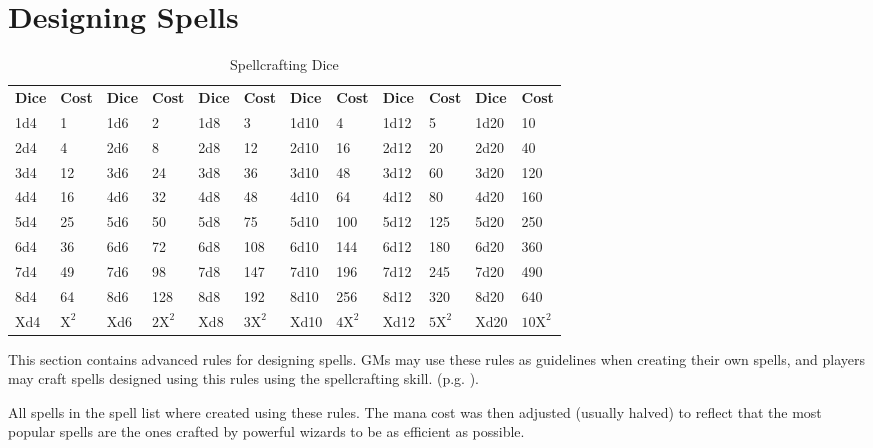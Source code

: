 \section{Designing Spells}

\begin{table*}[ht]
    \unclassedrowcolors
    \begin{tabularx}{\textwidth}{l X l X l X l X l X l X}
        \textbf{Dice} & \textbf{Cost} & \textbf{Dice} & \textbf{Cost} & \textbf{Dice} & \textbf{Cost} & \textbf{Dice} & \textbf{Cost} & \textbf{Dice} & \textbf{Cost} & \textbf{Dice} & \textbf{Cost} \\
        1d4 & 1   & 1d6 & 2    & 1d8 & 3    & 1d10 & 4    & 1d12 & 5    & 1d20 & 10    \\
        2d4 & 4   & 2d6 & 8    & 2d8 & 12   & 2d10 & 16   & 2d12 & 20   & 2d20 & 40    \\
        3d4 & 12  & 3d6 & 24   & 3d8 & 36   & 3d10 & 48   & 3d12 & 60   & 3d20 & 120   \\
        4d4 & 16  & 4d6 & 32   & 4d8 & 48   & 4d10 & 64   & 4d12 & 80   & 4d20 & 160   \\
        5d4 & 25  & 5d6 & 50   & 5d8 & 75   & 5d10 & 100  & 5d12 & 125  & 5d20 & 250   \\
        6d4 & 36  & 6d6 & 72   & 6d8 & 108  & 6d10 & 144  & 6d12 & 180  & 6d20 & 360   \\
        7d4 & 49  & 7d6 & 98   & 7d8 & 147  & 7d10 & 196  & 7d12 & 245  & 7d20 & 490   \\
        8d4 & 64  & 8d6 & 128  & 8d8 & 192  & 8d10 & 256  & 8d12 & 320  & 8d20 & 640   \\
        Xd4 & $\text{X}^\text{2}$ & Xd6 & $\text{2X}^\text{2}$ & Xd8 & $\text{3X}^\text{2}$ & Xd10 & $\text{4X}^\text{2}$ & Xd12 & $\text{5X}^\text{2}$ & Xd20 & $\text{10X}^\text{2}$ \\
    \end{tabularx}
    \caption{Spellcrafting Dice}
    \label{tab:spellcrafting-dice}
\end{table*}

This section contains advanced rules for designing spells. GMs may use these
rules as guidelines when creating their own spells, and players may craft
spells designed using this rules using the spellcrafting skill. (p.g.
\pageref{skill:spellcrafting}).

All spells in the spell list where created using these rules. The mana cost was
then adjusted (usually halved) to reflect that the most popular spells are the
ones crafted by powerful wizards to be as efficient as possible.

